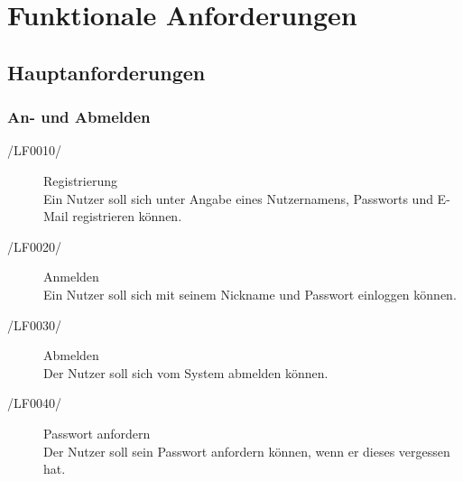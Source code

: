 \documentclass[11pt,a4paper]{scrreprt}
\begin{document}
\chapter{Funktionale Anforderungen}
\section{Hauptanforderungen}
\subsection{An- und Abmelden}
\begin{description}
\item[/LF0010/] Registrierung \\
Ein Nutzer soll sich unter Angabe eines Nutzernamens, Passworts und E-Mail registrieren können.
\item[/LF0020/] Anmelden \\
Ein Nutzer soll sich mit seinem Nickname und Passwort einloggen können.
\item[/LF0030/] Abmelden \\
Der Nutzer soll sich vom System abmelden können.
\item[/LF0040/] Passwort anfordern \\
Der Nutzer soll sein Passwort anfordern können, wenn er dieses vergessen hat.
\end{description}
\end{document}
